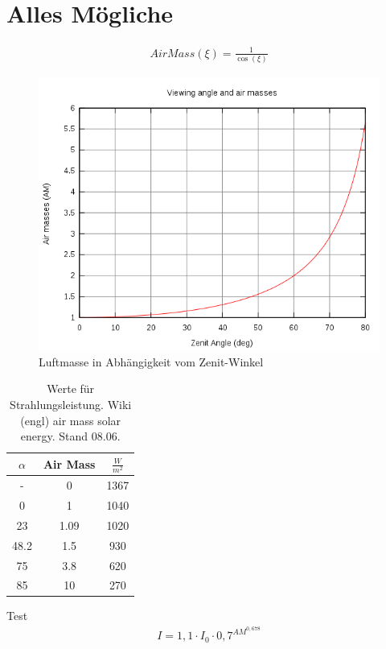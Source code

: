 \documentclass[fontsize=10pt,paper=a4,bibliography=totoc]{scrartcl}
\begin{document}
\section{Alles Mögliche}

\begin{align*}
	AirMass(\xi)=\frac{1}{\cos(\xi)}
\end{align*}

\begin{figure}
	\centering
	\includegraphics{images/Airmass.png}
	\caption{Luftmasse in Abhängigkeit vom Zenit-Winkel}
	\label{pic:AirMass}
\end{figure}

\begin{table}
\centering
	\caption{Werte für Strahlungsleistung. Wiki (engl) air mass solar energy. Stand 08.06.}
	\label{tab:airmass}
\begin{tabular}{|c|c|c|}
	\hline
	$\alpha$ & Air Mass & $\frac{W}{m^2}$\\
	\hline
	- & 0 & 1367\\
	\hline
	0 & 1 & 1040\\
	\hline
	23 & 1.09 & 1020\\
	\hline
	48.2 & 1.5 & 930\\
	\hline
	75 & 3.8 & 620\\
	\hline
	85 & 10 & 270\\
	\hline
\end{tabular}
\end{table}
Test
\begin{align*}
	I=1,1\cdot I_0 \cdot 0,7^{AM^{0,678}}
	\label{eqn:Intensity}
\end{align*}
\end{document}
